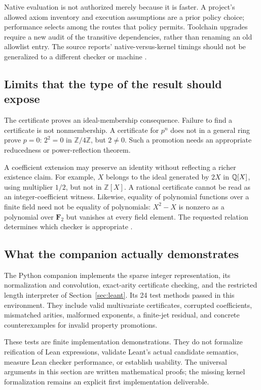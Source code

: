 \documentclass[11pt,a4paper]{article}
\newcommand{\Z}{\mathbb Z}\newcommand{\N}{\mathbb N}
\theoremstyle{plain}
\theoremstyle{definition}
\theoremstyle{remark}
\begin{document}
Native evaluation is not authorized merely because it is faster. A project's
allowed axiom inventory and execution assumptions are a prior policy choice;
performance selects among the routes that policy permits. Toolchain upgrades
require a new audit of the transitive dependencies, rather than renaming an
old allowlist entry. The source reports' native-versus-kernel timings should
not be generalized to a different checker or machine \cite{synthesis,workbenches}.

\subsection{Limits that the type of the result should expose}
The certificate proves an ideal-membership consequence. Failure to find a
certificate is not nonmembership. A certificate for $p^n$ does not in a general
ring prove $p=0$: $2^2=0$ in $\Z/4\Z$, but $2\ne0$. Such a promotion needs an
appropriate reducedness or power-reflection theorem.

A coefficient extension may preserve an identity without reflecting a richer
existence claim. For example, $X$ belongs to the ideal generated by $2X$ in
$\mathbb Q[X]$, using multiplier $1/2$, but not in $\Z[X]$. A rational certificate
cannot be read as an integer-coefficient witness. Likewise, equality of
polynomial functions over a finite field need not be equality of polynomials:
$X^2-X$ is nonzero as a polynomial over $\mathbf F_2$ but vanishes at every
field element. The requested relation determines which checker is appropriate
\cite{synthesis,workbenches}.

\subsection{What the companion actually demonstrates}
The Python companion implements the sparse integer representation, its
normalization and convolution, exact-arity certificate checking, and the
restricted length interpreter of Section~\ref{sec:leant}. Its 24 test methods
passed in this environment. They include valid multivariate certificates,
corrupted coefficients, mismatched arities, malformed exponents, a finite-jet
residual, and concrete counterexamples for invalid property promotions.

These tests are finite implementation demonstrations. They do not formalize
reification of Lean expressions, validate Leant's actual candidate semantics,
measure Lean checker performance, or establish usability. The universal
arguments in this section are written mathematical proofs; the missing
kernel formalization remains an explicit first implementation deliverable.
\end{document}
